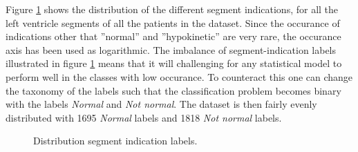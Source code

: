 \newpage

Figure \ref{fig:segm_label_dist} shows the distribution of the different segment indications, for all the left ventricle segments of all the patients in the dataset. 
Since the occurance of indications other that ''normal'' and ''hypokinetic'' are very rare, the occurance axis has been used as logarithmic. 
The imbalance of segment-indication labels illustrated in figure \ref{fig:segm_label_dist} means that it will challenging for any statistical model 
to perform well in the classes with low occurance. 
To counteract this one can change the taxonomy of the labels such that the classification problem becomes binary with the labels \textit{Normal} and \textit{Not normal}. 
The dataset is then fairly evenly distributed with 1695 \textit{Normal} labels and 1818 \textit{Not normal} labels. \bigskip

\begin{figure}[!h]
    \centering
    
    \caption{Distribution segment indication labels.}
    \label{fig:segm_label_dist}
\end{figure}

